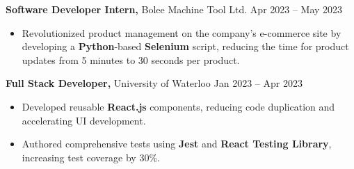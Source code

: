 \textbf{Software Developer Intern,} {Bolee Machine Tool Ltd.}  \hfill Apr 2023 -- May 2023 \\
\vspace{-9pt}
\begin{itemize}
  \item Revolutionized product management on the company's e-commerce site by developing a \textbf{Python}-based \textbf{Selenium} script, reducing the time for product updates from 5 minutes to 30 seconds per product.
\end{itemize}

\textbf{Full Stack Developer,} {University of Waterloo}  \hfill Jan 2023 -- Apr 2023 \\
\vspace{-9pt}
\begin{itemize}
  \item Developed reusable \textbf{React.js} components, reducing code duplication and accelerating UI development.
  \item Authored comprehensive tests using \textbf{Jest} and \textbf{React Testing Library}, increasing test coverage by 30\%.
\end{itemize}